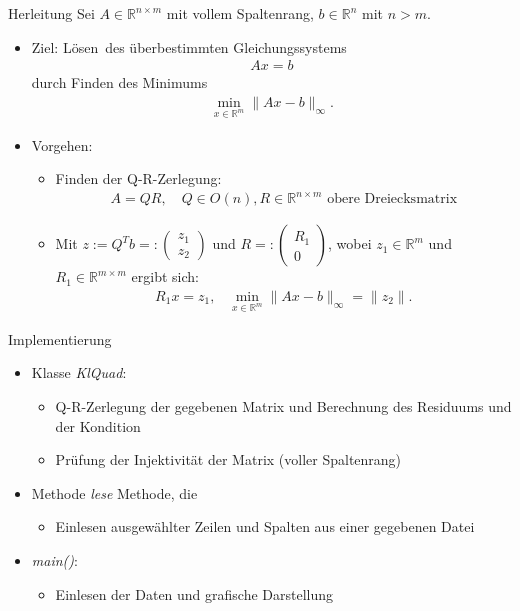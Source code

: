 \documentclass{beamer}
\begin{document}
\begin{frame}{Herleitung}
  Sei $A\in \mathbb{R}^{n\times m}$ mit vollem Spaltenrang,  $b\in \mathbb{R}^n$ mit $n>m$.\\
  \begin{itemize}
  \item Ziel: \glqq Lösen\grqq ~des überbestimmten Gleichungssystems 
  \begin{align}
  Ax=b
  \end{align}
  durch Finden des Minimums
  \begin{align}
  \min\limits_{x\in\mathbb{R}^m}\|Ax-b\|_\infty.
  \end{align}\pause
\item Vorgehen:
\begin{itemize}
\item Finden der Q-R-Zerlegung:
\begin{align}
A=QR, \text{~~~}Q\in  O(n), R\in \mathbb{R}^{n\times m}\text{ obere Dreiecksmatrix}
\end{align}\pause
\item Mit $z:=Q^Tb=:
\begin{pmatrix}
z_1\\
\hline
z_2
\end{pmatrix}$ und $R=:\begin{pmatrix}
R_1\\
0
\end{pmatrix}$, wobei $z_1\in\mathbb{R}^{m}$ und $R_1\in\mathbb{R}^{m\times m}$ ergibt sich:
\begin{align}
R_1x=z_1\text{,~~~}  \min\limits_{x\in\mathbb{R}^m}\|Ax-b\|_\infty=\|z_2\|.
\end{align}

\end{itemize}
  \end{itemize}
  
\end{frame}

 \begin{frame}{Implementierung}
 	\begin{itemize}
  	\item Klasse \textit{KlQuad}:
  	\begin{itemize}
  		\item Q-R-Zerlegung der gegebenen Matrix und Berechnung des Residuums und der Kondition
  		\item Prüfung der Injektivität der Matrix (voller Spaltenrang)
  	\end{itemize}
  	\pause
  	\item Methode \textit{lese} Methode, die 
  	  	\begin{itemize}
  		\item Einlesen ausgewählter Zeilen und Spalten aus einer gegebenen Datei
  	\end{itemize}
  	\pause
  	\item \textit{main()}:
  	  	\begin{itemize}
  		\item Einlesen der Daten und grafische Darstellung
  	\end{itemize}
  	\end{itemize}
 \end{frame}
\end{document}
